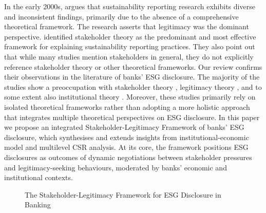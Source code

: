 \documentclass[
  authoryear]{elsarticle}
\makeatletter
\newcommand*\pandocbounded[1]{%
  \sbox\pandoc@box{#1}%
  \Gscale@div\@tempa{\textheight}{\dimexpr\ht\pandoc@box+\dp\pandoc@box\relax}%
  \Gscale@div\@tempb{\linewidth}{\wd\pandoc@box}%
  \ifdim\@tempb\p@<\@tempa\p@\let\@tempa\@tempb\fi%
  \ifdim\@tempa\p@<\p@\scalebox{\@tempa}{\usebox\pandoc@box}%
  \else\usebox{\pandoc@box}%
  \fi%
}
\makeatother
\begin{document}
In the early 2000s, \citet{HOOGHIEMSTRA2000} argues that sustainability
reporting research exhibits diverse and inconsistent findings, primarily
due to the absence of a comprehensive theoretical framework. The
research asserts that legitimacy was the dominant perspective.
\citet{SPENCE2010} identified stakeholder theory as the predominant and
most effective framework for explaining sustainability reporting
practices. They also point out that while many studies mention
stakeholders in general, they do not explicitly reference stakeholder
theory or other theoretical frameworks. Our review confirms their
observations in the literature of banks' ESG disclosure. The majority of
the studies show a preoccupation with stakeholder theory
\citep{GALANT2017, SHEN2016, BUALLAY2021}, legitimacy theory
\citep[e.g.][]{CARNEVALE2014}, and to some extent also institutional
theory \citep{HIGGINS2014, BEBBINGTON2018, CHRISTENSEN2021}. Moreover,
these studies primarily rely on isolated theoretical frameworks rather
than adopting a more holistic approach that integrates multiple
theoretical perspectives on ESG disclosure. In this paper we propose an
integrated Stakeholder-Legitimacy Framework of banks' ESG disclosure,
which synthesises and extends insights from \citet{CAMPBELL2007}
institutional-economic model and \citet{AGUINIS2012} multilevel CSR
analysis. At its core, the framework positions ESG disclosures as
outcomes of dynamic negotiations between stakeholder pressures and
legitimacy-seeking behaviours, moderated by banks' economic and
institutional contexts.

\begin{figure}

\centering{

\pandocbounded{\texttt{[image: flowchart.pdf]}}

}

\caption{\label{fig-flowchart}The Stakeholder-Legitimacy Framework for
ESG Disclosure in Banking}

\end{figure}%
\end{document}
